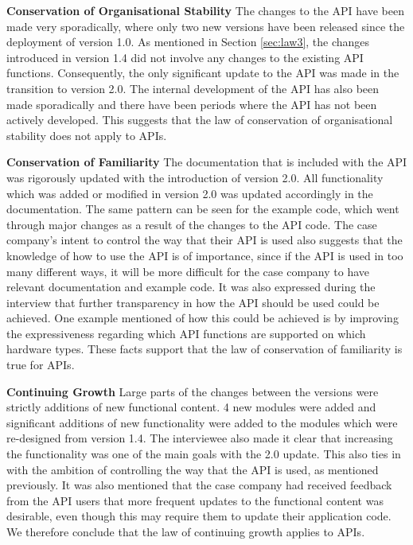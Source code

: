 \documentclass{sig-alternate}
\begin{document}
\smallskip \noindent
\textbf{Conservation of Organisational Stability  } 
The changes to the API have been made very sporadically, where only two new versions have been released since the deployment of version 1.0. As mentioned in Section \ref{sec:law3}, the changes introduced in version 1.4 did not involve any changes to the existing API functions. Consequently, the only significant update to the API was made in the transition to version 2.0. The internal development of the API has also been made sporadically and there have been periods where the API has not been actively developed. This suggests that the law of conservation of organisational stability does not apply to APIs. 

\smallskip \noindent
\textbf{Conservation of Familiarity  } 
The documentation that is included with the API was rigorously updated with the introduction of version 2.0. All functionality which was added or modified in version 2.0 was updated accordingly in the documentation. The same pattern can be seen for the example code, which went through major changes as a result of the changes to the API code. The case company's intent to control the way that their API is used also suggests that the knowledge of how to use the API is of importance, since if the API is used in too many different ways, it will be more difficult for the case company to have relevant documentation and example code. It was also expressed during the interview that further transparency in how the API should be used could be achieved. One example mentioned of how this could be achieved is by improving the expressiveness regarding which API functions are supported on which hardware types. These facts support that the law of conservation of familiarity is true for APIs. 

\smallskip \noindent
\textbf{Continuing Growth  } 
Large parts of the changes between the versions were strictly additions of new functional content. 4 new modules were added and significant additions of new functionality were added to the modules which were re-designed from version 1.4. The interviewee also made it clear that increasing the functionality was one of the main goals with the 2.0 update. This also ties in with the ambition of controlling the way that the API is used, as mentioned previously. It was also mentioned that the case company had received feedback from the API users that more frequent updates to the functional content was desirable, even though this may require them to update their application code. We therefore conclude that the law of continuing growth applies to APIs. 
\end{document}
